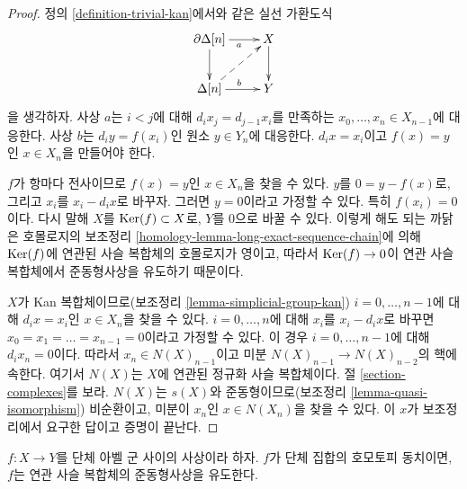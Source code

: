 \begin{proof}
정의 \ref{definition-trivial-kan}에서와 같은 실선 가환도식
$$
\xymatrix{
\partial \Delta[n] \ar[r]_a \ar[d] & X \ar[d] \\
\Delta[n] \ar[r]^b \ar@{-->}[ru] & Y
}
$$
을 생각하자. 사상 $a$는 $i < j$에 대해
$d_i x_j = d_{j - 1} x_i$를 만족하는
$x_0, \ldots, x_n \in X_{n - 1}$에 대응한다. 사상 $b$는
$d_iy = f(x_i)$인 원소 $y \in Y_n$에 대응한다. $d_ix = x_i$이고
$f(x) = y$인 $x \in X_n$을 만들어야 한다.

\medskip\noindent
$f$가 항마다 전사이므로 $f(x) = y$인 $x \in X_n$을 찾을 수 있다.
$y$를 $0 = y - f(x)$로, 그리고 $x_i$를 $x_i - d_ix$로 바꾸자.
그러면 $y = 0$이라고 가정할 수 있다. 특히 $f(x_i) = 0$이다.
다시 말해 $X$를 $\mathop{\mathrm{Ker}}(f) \subset X$로, $Y$를 $0$으로 바꿀 수 있다.
이렇게 해도 되는 까닭은 호몰로지의 보조정리
\ref{homology-lemma-long-exact-sequence-chain}에 의해 $\mathop{\mathrm{Ker}}(f)$에 연관된
사슬 복합체의 호몰로지가 영이고, 따라서 $\mathop{\mathrm{Ker}}(f) \to 0$이 연관 사슬
복합체에서 준동형사상을 유도하기 때문이다.

\medskip\noindent
$X$가 Kan 복합체이므로(보조정리 \ref{lemma-simplicial-group-kan})
$i = 0, \ldots, n - 1$에 대해 $d_i x = x_i$인 $x \in X_n$을 찾을 수
있다. $i = 0, \ldots, n$에 대해 $x_i$를 $x_i - d_ix$로 바꾸면
$x_0 = x_1 = \ldots = x_{n - 1} = 0$이라고 가정할 수 있다.
이 경우 $i = 0, \ldots, n - 1$에 대해 $d_i x_n = 0$이다. 따라서
$x_n \in N(X)_{n - 1}$이고 미분
$N(X)_{n - 1} \to N(X)_{n - 2}$의 핵에 속한다. 여기서 $N(X)$는
$X$에 연관된 정규화 사슬 복합체이다. 절 \ref{section-complexes}를
보라. $N(X)$는 $s(X)$와 준동형이므로(보조정리
\ref{lemma-quasi-isomorphism}) 비순환이고, 미분이 $x_n$인
$x \in N(X_n)$을 찾을 수 있다. 이 $x$가 보조정리에서 요구한 답이고
증명이 끝난다.
\end{proof}

\begin{lemma}
\label{lemma-homotopy-equivalence}
$f : X \to Y$를 단체 아벨 군 사이의 사상이라 하자. $f$가 단체 집합의
호모토피 동치이면, $f$는 연관 사슬 복합체의 준동형사상을 유도한다.
\end{lemma}

